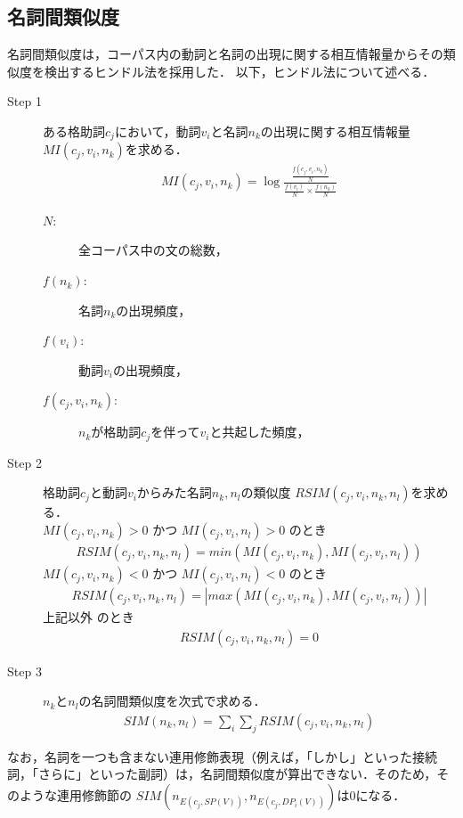 \subsection{名詞間類似度}
名詞間類似度は，コーパス内の動詞と名詞の出現に関する相互情報量からその類似度を検出するヒンドル法\cite{Hindle,jHindle}を採用した．
以下，ヒンドル法について述べる．
\begin{description}
  \item[Step 1] ある格助詞$c_{j}$において，動詞$v_{i}$と名詞$n_{k}$の出現に関する相互情報量$MI(c_{j},v_{i},n_{k})$を求める．
\begin{eqnarray}
  MI(c_{j},v_{i},n_{k}) = \log\frac{
  \frac{f(c_{j},v_{i},n_{k})}{N}}{
  \frac{f(v_{i})}{N} \times \frac{f(n_{k})}{N}}
\end{eqnarray}
\begin{description} 
  \item[$N$:] 全コーパス中の文の総数，
  \item[$f(n_{k})$:] 名詞$n_{k}$の出現頻度，
  \item[$f(v_{i})$:] 動詞$v_{i}$の出現頻度，
  \item[$f(c_{j},v_{i},n_{k})$:] $n_{k}$が格助詞$c_{j}$を伴って$v_{i}$と共起した頻度，
\end{description}

  \item[Step 2] 格助詞$c_{j}$と動詞$v_{i}$からみた名詞$n_{k},n_{l}$の類似度
$RSIM(c_{j},v_{i},n_{k},n_{l})$を求める．\\
$MI(c_{j},v_{i},n_{k}) > 0$ かつ $ MI(c_{j},v_{i},n_{l}) > 0$ のとき
\begin{eqnarray}
  RSIM(c_{j},v_{i},n_{k},n_{l}) = min(MI(c_{j},v_{i},n_{k}), MI(c_{j},v_{i},n_{l})) \nonumber
\end{eqnarray}
$MI(c_{j},v_{i},n_{k}) < 0$ かつ $ MI(c_{j},v_{i},n_{l}) < 0$ のとき
\begin{eqnarray}
  RSIM(c_{j},v_{i},n_{k},n_{l}) = | max(MI(c_{j},v_{i},n_{k}), MI(c_{j},v_{i},n_{l})) | \nonumber
\end{eqnarray}
上記以外 のとき
\begin{eqnarray}
  RSIM(c_{j},v_{i},n_{k},n_{l}) = 0 \nonumber
\end{eqnarray}
\item[Step 3] $n_{k}$と$n_{l}$の名詞間類似度を次式で求める．
\begin{eqnarray}
  SIM(n_{k},n_{l}) = \sum_{i}\sum_{j} RSIM(c_{j},v_{i},n_{k},n_{l})
\end{eqnarray}
\end{description}
なお，名詞を一つも含まない連用修飾表現（例えば，「しかし」といった接続詞，「さらに」といった副詞）は，名詞間類似度が算出できない．そのため，そのような連用修飾節の
$SIM(n_{E(c_{j},SP(V))},n_{E(c_{j},DP_{i}(V))})$は$0$になる．
